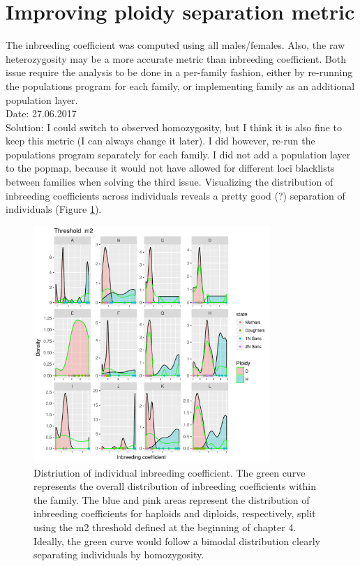 \documentclass[10pt,a4paper]{report}
\begin{document}
\section{Improving ploidy separation metric}

The inbreeding coefficient was computed using all males/females. Also, the raw heterozygosity may be a more accurate metric than inbreeding coefficient. Both issue require the analysis to be done in a per-family fashion, either by re-running the populations program for each family, or implementing family as an additional population layer.
\\
Date: 27.06.2017
\\
Solution: I could switch to observed homozygosity, but I think it is also fine to keep this metric (I can always change it later). I did however, re-run the populations program separately for each family. I did not add a population layer to the popmap, because it would not have allowed for different loci blacklists between families when solving the third issue. Visualizing the distribution of inbreeding coefficients across individuals reveals a pretty good (?) separation of individuals (Figure \ref{ploidy_metric}).


\begin{figure}[h]
	\begin{center}
		\includegraphics[width=0.8\textwidth]{cleaning_genomic_data/F_r-75_d-5_m2_density.pdf}
		\caption{Distriution of individual inbreeding coefficient. The green curve represents the overall distribution of inbreeding coefficients within the family. The blue and pink areas represent the distribution of inbreeding coefficients for haploids and diploids, respectively, split using the m2 threshold defined at the beginning of chapter 4. Ideally, the green curve would follow a bimodal distribution clearly separating individuals by homozygosity.}
		\label{ploidy_metric}
	\end{center}
\end{figure}
\end{document}
